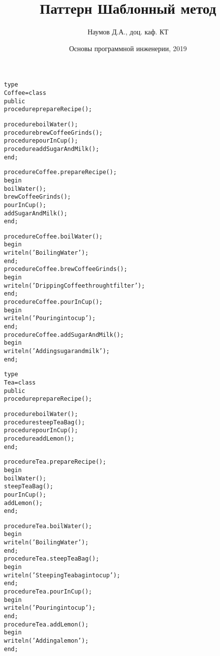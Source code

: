 \documentclass{beamer}
\title[Software Design]{Паттерн Шаблонный метод}
\author{Наумов Д.А., доц. каф. КТ}
\date[03.12.2019] {Основы программной инженерии, 2019}
\begin{document}
\begin{frame}[fragile]
\begin{alltt}
type
  Coffee = class
    public
      procedure prepareRecipe();

      procedure boilWater();
      procedure brewCoffeeGrinds();
      procedure pourInCup();
      procedure addSugarAndMilk();
  end;

procedure Coffee.prepareRecipe();
begin
  boilWater();
  brewCoffeeGrinds();
  pourInCup();
  addSugarAndMilk();
end;
\end{alltt}
\end{frame}
\begin{frame}[fragile]
\begin{alltt}
procedure Coffee.boilWater();
begin
  writeln('Boiling Water');
end;
procedure Coffee.brewCoffeeGrinds();
begin
  writeln('Dripping Coffee throught filter');
end;
procedure Coffee.pourInCup();
begin
  writeln('Pouring into cup');
end;
procedure Coffee.addSugarAndMilk();
begin
  writeln('Adding sugar and milk');
end;
\end{alltt}
\end{frame}

\begin{frame}[fragile]
\begin{alltt}
type
  Tea = class
    public
      procedure prepareRecipe();

      procedure boilWater();
      procedure steepTeaBag();
      procedure pourInCup();
      procedure addLemon();
  end;
\end{alltt}
\end{frame}

\begin{frame}[fragile]
\begin{alltt}
procedure Tea.prepareRecipe();
begin
  boilWater();
  steepTeaBag();
  pourInCup();
  addLemon();
end;
\end{alltt}
\end{frame}

\begin{frame}[fragile]
\begin{alltt}
procedure Tea.boilWater();
begin
  writeln('Boiling Water');
end;
procedure Tea.steepTeaBag();
begin
  writeln('Steeping Tea bag into cup');
end;
procedure Tea.pourInCup();
begin
  writeln('Pouring into cup');
end;
procedure Tea.addLemon();
begin
  writeln('Adding a lemon');
end;
\end{alltt}
\end{frame}
\end{document}
